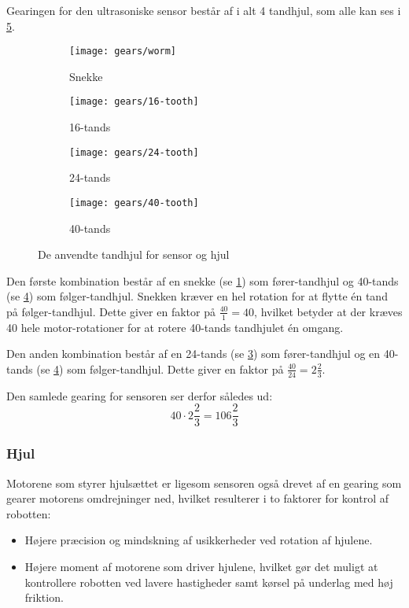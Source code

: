 Gearingen for den ultrasoniske sensor består af i alt 4 tandhjul, som alle kan ses i \cref{gearing:tandhjul}.

\begin{figure}[h] %
\centering
\begin{subfigure}[b]{.19\textwidth}
\centering
\texttt{[image: gears/worm]}
\caption{Snekke}
\label{gearing:snekke}
\end{subfigure}
\begin{subfigure}[b]{.19\textwidth}
\centering
\texttt{[image: gears/16-tooth]}
\caption{16-tands}
\label{gearing:16tand}
\end{subfigure}
\begin{subfigure}[b]{.19\textwidth}
\centering
\texttt{[image: gears/24-tooth]}
\caption{24-tands}
\label{gearing:24tand}
\end{subfigure}
\begin{subfigure}[b]{.19\textwidth}
\centering
\texttt{[image: gears/40-tooth]}
\caption{40-tands}
\label{gearing:40tand}
\end{subfigure}
\caption{De anvendte tandhjul for sensor og hjul}
\label{gearing:tandhjul}
\end{figure}

Den første kombination består af en snekke\cite{snekke} (se \cref{gearing:snekke}) som fører-tandhjul og 40-tands (se \cref{gearing:40tand}) som følger-tandhjul.
Snekken kræver en hel rotation for at flytte én tand på følger-tandhjul.
Dette giver en faktor på $\frac{40}{1} = 40$, hvilket betyder at der kræves 40 hele motor-rotationer for at rotere 40-tands tandhjulet én omgang.

Den anden kombination består af en 24-tands (se \cref{gearing:24tand}) som fører-tandhjul og en 40-tands (se \cref{gearing:40tand}) som følger-tandhjul.
Dette giver en faktor på $\frac{40}{24} = 2\frac{2}{3}$.

Den samlede gearing for sensoren ser derfor således ud: $$40 \cdot 2\frac{2}{3} = 106 \frac{2}{3}$$

\subsubsection{Hjul}
Motorene som styrer hjulsættet er ligesom sensoren også drevet af en gearing som gearer motorens omdrejninger ned, hvilket resulterer i to faktorer for kontrol af robotten:

\begin{itemize}
\item Højere præcision og mindskning af usikkerheder ved rotation af hjulene.
\item Højere moment af motorene som driver hjulene, hvilket gør det muligt at kontrollere robotten ved lavere hastigheder samt kørsel på underlag med høj friktion.
\end{itemize}

